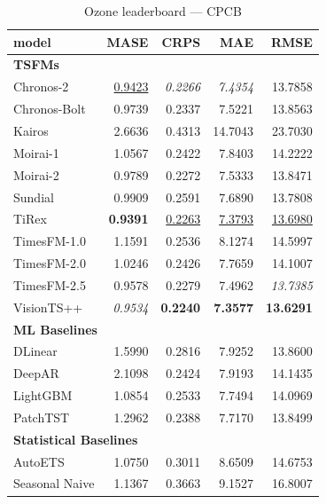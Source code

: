 \begin{table}[H]
\caption{Ozone leaderboard --- CPCB}
\centering
\begin{small}
\begin{tabular}{lrrrr}
\toprule
model & MASE & CRPS & MAE & RMSE \\
\midrule
\multicolumn{5}{l}{\textbf{TSFMs}} \\
Chronos-2 & \underline{0.9423} & \textit{0.2266} & \textit{7.4354} & 13.7858 \\
Chronos-Bolt & 0.9739 & 0.2337 & 7.5221 & 13.8563 \\
Kairos & 2.6636 & 0.4313 & 14.7043 & 23.7030 \\
Moirai-1 & 1.0567 & 0.2422 & 7.8403 & 14.2222 \\
Moirai-2 & 0.9789 & 0.2272 & 7.5333 & 13.8471 \\
Sundial & 0.9909 & 0.2591 & 7.6890 & 13.7808 \\
TiRex & \textbf{0.9391} & \underline{0.2263} & \underline{7.3793} & \underline{13.6980} \\
TimesFM-1.0 & 1.1591 & 0.2536 & 8.1274 & 14.5997 \\
TimesFM-2.0 & 1.0246 & 0.2426 & 7.7659 & 14.1007 \\
TimesFM-2.5 & 0.9578 & 0.2279 & 7.4962 & \textit{13.7385} \\
VisionTS++ & \textit{0.9534} & \textbf{0.2240} & \textbf{7.3577} & \textbf{13.6291} \\
\midrule
\multicolumn{5}{l}{\textbf{ML Baselines}} \\
DLinear & 1.5990 & 0.2816 & 7.9252 & 13.8600 \\
DeepAR & 2.1098 & 0.2424 & 7.9193 & 14.1435 \\
LightGBM & 1.0854 & 0.2533 & 7.7494 & 14.0969 \\
PatchTST & 1.2962 & 0.2388 & 7.7170 & 13.8499 \\
\midrule
\multicolumn{5}{l}{\textbf{Statistical Baselines}} \\
AutoETS & 1.0750 & 0.3011 & 8.6509 & 14.6753 \\
Seasonal Naive & 1.1367 & 0.3663 & 9.1527 & 16.8007 \\
\bottomrule
\end{tabular}
\end{small}
\end{table}